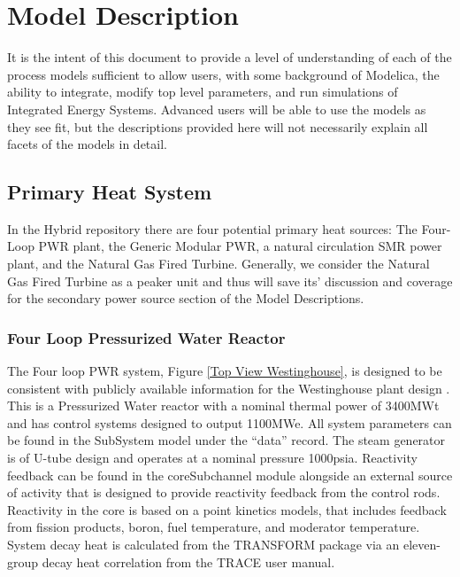 \section{Model Description}
It is the intent of this document to provide a level of understanding of each of the process models sufficient to allow users, with some background of Modelica, the ability to integrate, modify top level parameters, and run simulations of Integrated Energy Systems. Advanced users will be able to use the models as they see fit, but the descriptions provided here will not necessarily explain all facets of the models in detail. 

\subsection{Primary Heat System}
In the Hybrid repository there are four potential primary heat sources: The  Four-Loop PWR plant, the Generic Modular PWR, a natural circulation SMR power plant, and the Natural Gas Fired Turbine. Generally, we consider the Natural Gas Fired Turbine as a peaker unit and thus will save its’ discussion and coverage for the secondary power source section of the Model Descriptions.

\subsubsection{Four Loop Pressurized Water Reactor}

The Four loop PWR system, Figure \ref{Top View Westinghouse}, is designed to be consistent with publicly available information for the Westinghouse plant design \cite{Westinghouse}. This is a Pressurized Water reactor with a nominal thermal power of 3400MWt and has control systems designed to output 1100MWe. All system parameters can be found in the SubSystem model under the “data” record. The steam generator is of U-tube design and operates at a nominal pressure 1000psia. Reactivity feedback can be found in the coreSubchannel module alongside an external source of activity that is designed to provide reactivity feedback from the control rods. Reactivity in the core is based on a point kinetics models, that includes feedback from fission products, boron, fuel temperature, and moderator temperature. System decay heat is calculated from the TRANSFORM package via an eleven-group decay heat correlation from the TRACE user manual.

